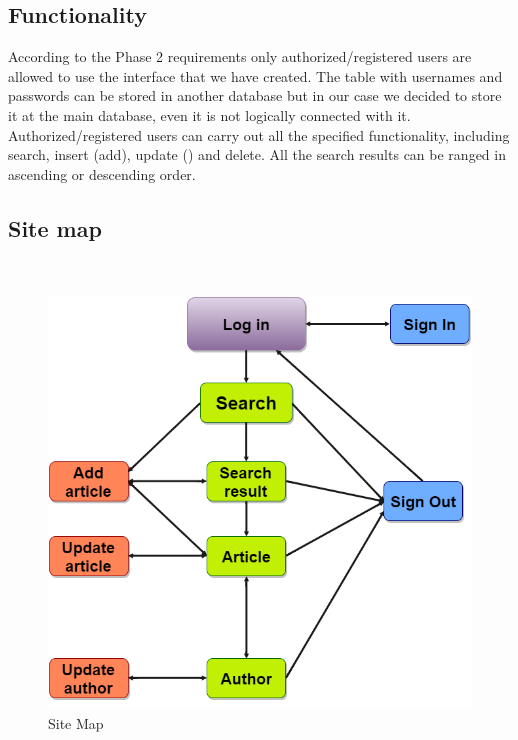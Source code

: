 \documentclass{article}
\begin{document}
\subsection{Functionality}
According to the Phase 2 requirements only authorized/registered users are allowed to use the interface that we have created. The table with usernames and passwords can be stored in another database but in our case we decided to store it at the main database, even it is not logically connected with it.
Authorized/registered users can carry out all the specified functionality, including search, insert (add), update () and delete.
All the search results can be ranged in ascending or descending order.

\newpage
\subsection{Site map}
~
\newline
\begin{figure}[h!]
  \centering
      \includegraphics[height=11cm]{sitemap.png}
  \caption{Site Map}
\end{figure}

\newpage
\end{document}
